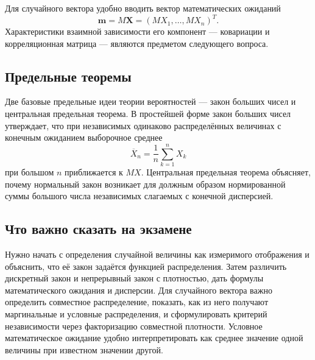 Для случайного вектора удобно вводить вектор математических ожиданий
\[
    \mathbf m=M\mathbf X=(MX_1,\ldots,MX_n)^T.
\]
Характеристики взаимной зависимости его компонент --- ковариации и
корреляционная матрица --- являются предметом следующего вопроса.

\subsection{Предельные теоремы}

Две базовые предельные идеи теории вероятностей --- закон больших чисел и
центральная предельная теорема. В простейшей форме закон больших чисел утверждает,
что при независимых одинаково распределённых величинах с конечным ожиданием
выборочное среднее
\[
    \overline X_n=\frac1n\sum_{k=1}^nX_k
\]
при большом $n$ приближается к $MX$. Центральная предельная теорема объясняет,
почему нормальный закон возникает для должным образом нормированной суммы
большого числа независимых слагаемых с конечной дисперсией.

\subsection{Что важно сказать на экзамене}

Нужно начать с определения случайной величины как измеримого отображения и
объяснить, что её закон задаётся функцией распределения. Затем различить
дискретный закон и непрерывный закон с плотностью, дать формулы математического
ожидания и дисперсии. Для случайного вектора важно определить совместное
распределение, показать, как из него получают маргинальные и условные
распределения, и сформулировать критерий независимости через факторизацию
совместной плотности. Условное математическое ожидание удобно интерпретировать
как среднее значение одной величины при известном значении другой.

\newpage
